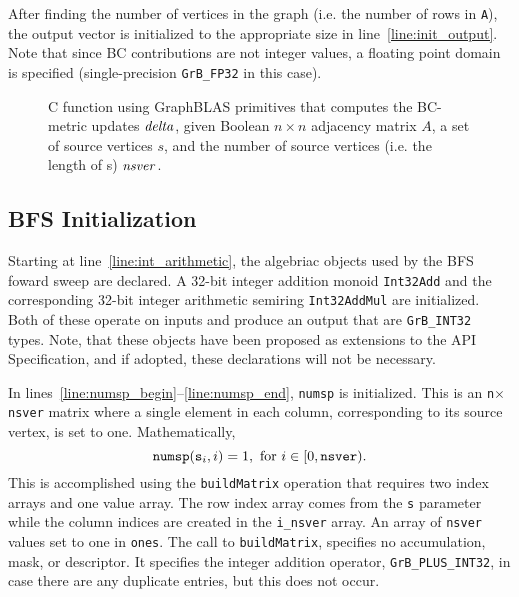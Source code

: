 After finding the number of vertices in the graph (i.e. the number of rows in 
{\tt A}), the output vector is initialized to the appropriate size in 
line~\ref{line:init_output}.  Note that since BC contributions are not integer
values, a floating point domain is specified (single-precision {\tt GrB\_FP32} 
in this case).


\begin{figure*}[h]
\caption{C function using GraphBLAS primitives that computes the BC-metric
updates ${\it delta}$, given Boolean $n \times n$ adjacency matrix $A$, a
set of source vertices $s$, and the number of source vertices (i.e. the 
length of s) ${\it nsver}$.}
\label{Fig:BClisting}
{\scriptsize

}
\end{figure*}

\subsection{BFS Initialization}
 
Starting at line~\ref{line:int_arithmetic}, the algebriac objects used by the
BFS foward sweep are declared.  A 32-bit integer addition monoid {\tt Int32Add}
and the corresponding 32-bit integer arithmetic semiring {\tt Int32AddMul} are
initialized.  Both of these operate on inputs and produce an output that are
{\tt GrB\_INT32} types.  Note, that these objects have been proposed as
extensions to the API Specification, and if adopted, these declarations will not
be necessary.

In lines~\ref{line:numsp_begin}--\ref{line:numsp_end}, {\tt numsp} is initialized.
This is an {\tt n}$\times${\tt nsver} matrix where 
a single element in each column, corresponding to its source vertex, 
is set to one.  Mathematically,
\begin{equation}
	{\tt numsp}({{\tt s}_i},i) = 1, \text{ for } i \in [0,{\tt nsver}).
\label{eqn:bc}
\end{equation}
This is accomplished using the {\tt buildMatrix} operation that
requires two index arrays and one value array.  The row index array comes from 
the {\tt s} parameter while the column indices are created in the {\tt i\_nsver}
array.  An array of {\tt nsver} values set to one in {\tt ones}.  The call to
{\tt buildMatrix}, specifies no accumulation, mask, or descriptor.  It specifies
the integer addition operator, {\tt GrB\_PLUS\_INT32}, in case there are any
duplicate entries, but this does not occur.


